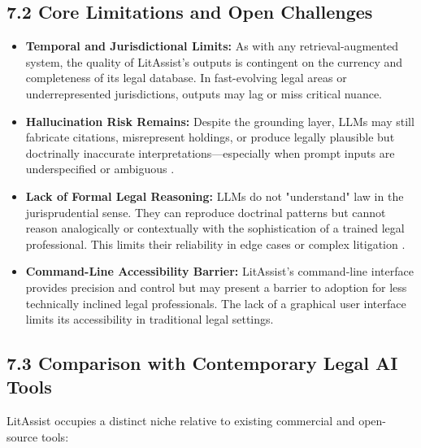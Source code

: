 \documentclass[12pt,a4paper]{article}
\begin{document}
\subsection*{7.2 Core Limitations and Open Challenges}

\begin{itemize}
\item \textbf{Temporal and Jurisdictional Limits:} As with any retrieval-augmented system, the quality of LitAssist's outputs is contingent on the currency and completeness of its legal database. In fast-evolving legal areas or underrepresented jurisdictions, outputs may lag or miss critical nuance.

\item \textbf{Hallucination Risk Remains:} Despite the grounding layer, LLMs may still fabricate citations, misrepresent holdings, or produce legally plausible but doctrinally inaccurate interpretations—especially when prompt inputs are underspecified or ambiguous \cite{Zhao2021}.

\item \textbf{Lack of Formal Legal Reasoning:} LLMs do not "understand" law in the jurisprudential sense. They can reproduce doctrinal patterns but cannot reason analogically or contextually with the sophistication of a trained legal professional. This limits their reliability in edge cases or complex litigation \cite{Gordon2007}.

\item \textbf{Command-Line Accessibility Barrier:} LitAssist's command-line interface provides precision and control but may present a barrier to adoption for less technically inclined legal professionals. The lack of a graphical user interface limits its accessibility in traditional legal settings.
\end{itemize}

\subsection*{7.3 Comparison with Contemporary Legal AI Tools}

LitAssist occupies a distinct niche relative to existing commercial and open-source tools:
\end{document}
